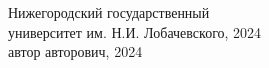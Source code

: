 \begin{titlepage}
\begin{spacing}{0.92}
\begin{adjustwidth}{6.5cm}{0cm}
Нижегородский государственный\\
\makebox[1cm]{}университет им. Н.И. Лобачевского, 2024\\
 автор авторович, 2024
\end{adjustwidth}
\end{spacing}

\end{titlepage}